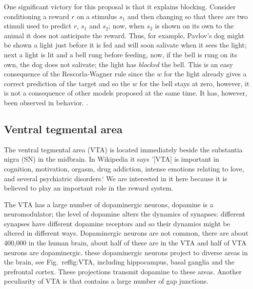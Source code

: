 \documentclass[11pt,a4paper]{scrartcl}
\begin{document}
One significant victory for this proposal is that it explains
blocking. Consider conditioning a reward $r$ on a stimulus $s_1$ and
then changing so that there are two stimuli used to predict $r$, $s_1$
and $s_2$; now, when $s_2$ is shown on its own to the animal it does
not anticipate the reward. Thus, for example, Pavlov's dog might be
shown a light just before it is fed and will soon salivate when it
sees the light; next a light is lit and a bell rung before feeding,
now, if the bell is rung on its own, the dog does not salivate; the
light has \textsl{blocked} the bell. This is an easy consequence of
the Rescorla-Wagner rule since the $w$ for the light already gives a
correct prediction of the target and so the $w$ for the bell stays at
zero, however, it is not a consequence of other models proposed at the
same time. It has, however, been observed in behavior.
\cite{MillerEtAl1995a,AzorlosaCicala1986a}.

\subsection*{Ventral tegmental area}

The ventral tegmental area (VTA) is located immediately beside the
substantia nigra (SN) in the midbrain. In Wikipedia it says \rq{}[VTA] is
important in cognition, motivation, orgasm, drug addiction, intense
emotions relating to love, and several psychiatric disorders.\lq{} We
are interested in it here because it is believed to play an important
role in the reward system. 

The VTA has a large number of dopaminergic neurons, dopamine is a
neuromodulator; the level of dopamine alters the dynamics of synapses:
different synapses have different dopamine receptors and so their
dynamics might be altered in different ways. Dopaminergic neurons are
not common, there are about 400,000 in the human brain, about half of
these are in the VTA and half of VTA neurons are dopaminergic. these
dopaminergic neurons project to diverse areas in the brain, see
Fig.~ref{fig:VTA}, including hippocampus, basal ganglia and the
prefrontal cortex. These projections transmit dopamine to these
areas. Another peculiarity of VTA is that contains a large number of
gap junctions.
\end{document}
